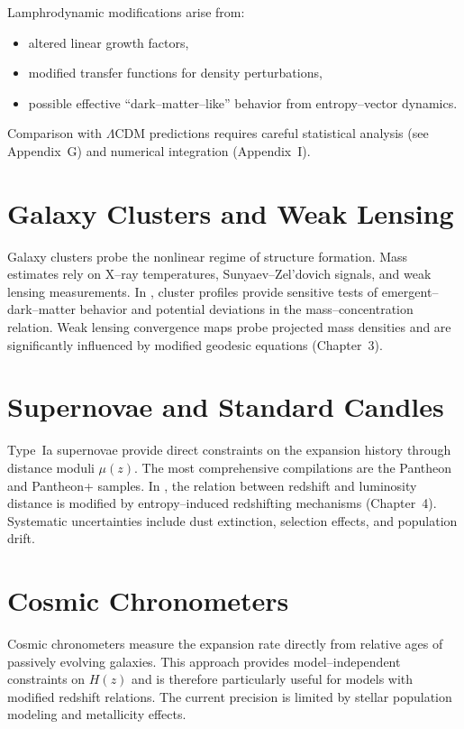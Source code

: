 Lamphrodynamic modifications arise from:
\begin{itemize}
  \item altered linear growth factors,
  \item modified transfer functions for density perturbations,
  \item possible effective ``dark--matter--like'' behavior from
    entropy--vector dynamics.
\end{itemize}
Comparison with $\Lambda$CDM predictions requires careful statistical
analysis (see Appendix~G) and numerical integration (Appendix~I).

\section{Galaxy Clusters and Weak Lensing}

Galaxy clusters probe the nonlinear regime of structure formation.
Mass estimates rely on X--ray temperatures, Sunyaev--Zel'dovich
signals, and weak lensing measurements.  In \rsvpabbr{}, cluster
profiles provide sensitive tests of emergent--dark--matter behavior and
potential deviations in the mass--concentration relation.  Weak
lensing convergence maps probe projected mass densities and are
significantly influenced by modified geodesic equations (Chapter~3).

\section{Supernovae and Standard Candles}

Type~Ia supernovae provide direct constraints on the expansion
history through distance moduli $\mu(z)$.  The most comprehensive
compilations are the Pantheon and Pantheon+ samples.  In \rsvpabbr{},
the relation between redshift and luminosity distance is modified by
entropy--induced redshifting mechanisms (Chapter~4).  Systematic
uncertainties include dust extinction, selection effects, and
population drift.

\section{Cosmic Chronometers}

Cosmic chronometers measure the expansion rate directly from relative
ages of passively evolving galaxies.  This approach provides
model--independent constraints on $H(z)$ and is therefore particularly
useful for models with modified redshift relations.  The current
precision is limited by stellar population modeling and metallicity
effects.

